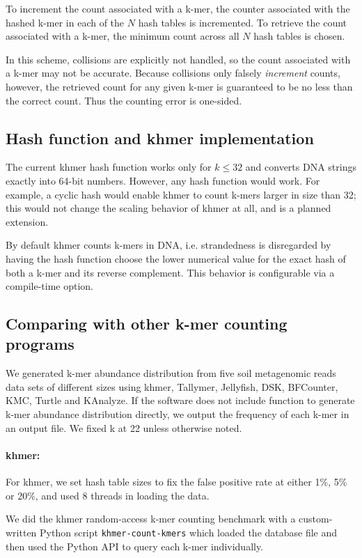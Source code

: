 To increment the count associated with a k-mer, the counter associated
with the hashed k-mer in each of the $N$ hash tables is incremented.
To retrieve the count associated with a k-mer, the minimum count
across all $N$ hash tables is chosen.

In this scheme, collisions are explicitly not handled, so the count
associated with a k-mer may not be accurate. Because collisions only
falsely {\em increment} counts, however, the retrieved count for any
given k-mer is guaranteed to be no less than the correct count.  Thus
the counting error is one-sided.

\subsection{Hash function and khmer implementation}

The current khmer hash function works only for $k \le 32$ and converts
DNA strings exactly into 64-bit numbers.  However, any hash function
would work. For example, a cyclic hash would enable khmer to count
k-mers larger in size than 32; this would not change the scaling
behavior of khmer at all, and is a planned extension.

By default khmer counts k-mers in DNA, i.e. strandedness is
disregarded by having the hash function choose the lower numerical
value for the exact hash of both a k-mer and its reverse complement.
This behavior is configurable via a compile-time option.

\subsection{Comparing with other k-mer counting programs}

We generated k-mer abundance distribution from five soil metagenomic reads
data sets of different sizes using khmer, Tallymer, Jellyfish, DSK, BFCounter, 
KMC, Turtle and KAnalyze. If the software 
does not include function to generate k-mer abundance distribution directly, we output the
frequency of each k-mer in an output file.
We fixed k at 22 unless otherwise noted.

\paragraph{khmer:}
For khmer, we set hash table sizes to fix the false positive rate at
either 1\%, 5\% or 20\%, and used 8 threads in loading the data.

We did the khmer random-access k-mer counting benchmark with a
custom-written Python script {\tt khmer-count-kmers} which loaded the
database file and then used the Python API to query each k-mer
individually.

